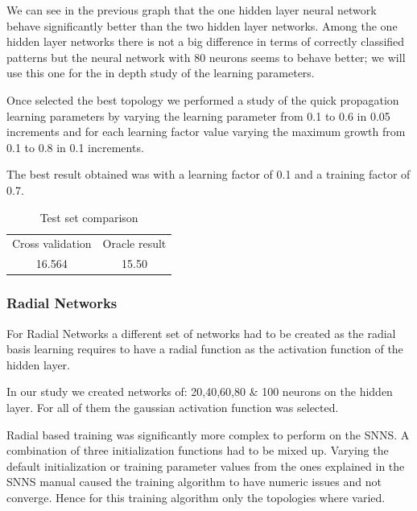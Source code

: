 \documentclass[a4paper,10pt,titlepage]{article}
\begin{document}
\par We can see in the previous graph that the one hidden layer neural network behave significantly better than the two hidden layer networks. Among the one hidden layer networks there is not a big difference in terms of correctly classified patterns but the neural network with 80 neurons seems to behave better; we will use this one for the in depth study of the learning parameters.

\par Once selected the best topology we performed a study of the quick propagation learning parameters by varying the learning parameter from 0.1 to 0.6 in 0.05 increments and for each learning factor value varying the maximum growth from 0.1 to 0.8 in 0.1 increments. 

\par The best result obtained was with a learning factor of 0.1 and a training factor of 0.7. 

\begin{table}[H] 
\caption{Test set comparison} %
\centering 
\begin{tabular}{c c} 
\hline\hline 
Cross validation & Oracle result \\
16.564 & 15.50 \\

\hline 
\end{tabular} 
\label{tab:dist_result} 
\end{table}



\subsubsection{Radial Networks}

\par For Radial Networks a different set of networks had to be created as the radial basis learning requires to have a radial function as the activation function of the hidden layer. 

\par In our study we created networks of: 20,40,60,80 \& 100 neurons on the hidden layer. For all of them the gaussian activation function was selected. 

\par Radial based training was significantly more complex to perform on the SNNS. A combination of three initialization functions had to be mixed up. Varying the default initialization or training parameter values from the ones explained in the SNNS manual caused the training algorithm to have numeric issues and not converge. Hence for this training algorithm only the topologies where varied.
\end{document}
